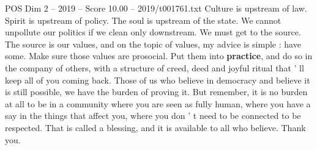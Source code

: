\begin{textsample}{POS Dim 2 – 2019 – Score 10.00 – 2019/t001761.txt}
Culture is upstream of law.
Spirit is upstream of policy.
The soul is upstream of the state.
We cannot unpollute our politics if we clean only downstream.
We must get to the source.
The source is our values, and on the topic of values, my advice is simple : have some.
Make sure those values are prosocial.
Put them into \textbf{practice}, and do so in the company of others, with a structure of creed, deed and joyful ritual that ' ll keep all of you coming back.
Those of us who believe in democracy and believe it is still possible, we have the burden of proving it.
But remember, it is no burden at all to be in a community where you are seen as fully human, where you have a say in the things that affect you, where you don ' t need to be connected to be respected.
That is called a blessing, and it is available to all who believe.
Thank you.

\end{textsample}
